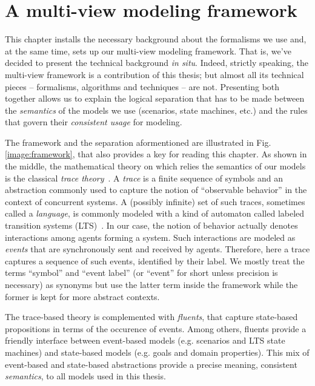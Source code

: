 \chapter{A multi-view modeling framework\label{chapter:framework}}

This chapter installs the necessary background about the formalisms we use and, at the same time, sets up our multi-view modeling framework. That is, we've decided to present the technical background \emph{in situ}. Indeed, strictly speaking, the multi-view framework is a contribution of this thesis; but almost all its technical pieces -- formalisms, algorithms and techniques -- are not. Presenting both together allows us to explain the logical separation that has to be made between the \emph{semantics} of the models we use (scenarios, state machines, etc.) and the rules that govern their \emph{consistent usage} for modeling. 

The framework and the separation aformentioned are illustrated in Fig. \ref{image:framework}, that also provides a key for reading this chapter. As shown in the middle, the mathematical theory on which relies the semantics of our models is the classical \emph{trace theory}~\cite{Hoare:1985}. A \emph{trace} is a finite sequence of symbols and an abstraction commonly used to capture the notion of ``observable behavior'' in the context of concurrent systems. A (possibly infinite) set of such traces, sometimes called a \emph{language}, is commonly modeled with a kind of automaton called labeled transition systems (LTS)~\cite{Keller:1976, Clarke:1989, Milner:1989}. In our case, the notion of behavior actually denotes interactions among agents forming a system. Such interactions are modeled as \emph{events} that are synchronously sent and received by agents. Therefore, here a trace captures a sequence of such events, identified by their label. We mostly treat the terms ``symbol'' and ``event label'' (or ``event'' for short unless precision is necessary) as synonyms but use the latter term inside the framework while the former is kept for more abstract contexts.

The trace-based theory is complemented with \emph{fluents}, that capture state-based propositions in terms of the occurence of events. Among others, fluents provide a friendly interface between event-based models (e.g. scenarios and LTS state machines) and state-based models (e.g. goals and domain properties). This mix of event-based and state-based abstractions provide a precise meaning, consistent \emph{semantics}, to all models used in this thesis. 

